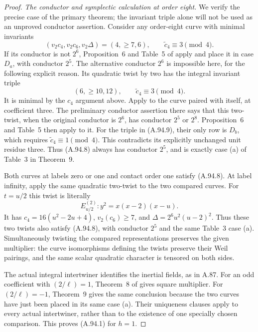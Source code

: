 \begin{proof}
\emph{The conductor and symplectic calculation at order eight.}
We verify the precise case of the primary theorem;
the invariant triple alone will not be used as an
unproved conductor assertion.
Consider any order-eight curve with minimal
invariants
\[
       (v_2c_4,v_2c_6,v_2\Delta)=(4,\ge7,6),
                   \qquad\widetilde c_4\equiv3\pmod4.
\tag{A.94.8}
\]
If its conductor is not $2^6$, Proposition~6 and
Table~5 of \cite{LegFreitasKraus2022} apply and
place it in case $D_a$, with conductor $2^5$.
The alternative conductor $2^6$ is impossible
here, for the following explicit reason.
Its quadratic twist by two has the integral
invariant triple
\[
                   (6,\ge10,12),
                 \qquad\widetilde c_4\equiv3\pmod4.
\tag{A.94.9}
\]
It is minimal by the $c_4$ argument above.
Apply \cite[Theorem~9]{LegFreitasKraus2022} to the
curve paired with itself, at coefficient three.
The preliminary conductor assertion there says
that this two-twist, when the original conductor
is $2^6$, has conductor $2^5$ or $2^8$.
Proposition~6 and Table~5 then apply to it.
For the triple in (A.94.9), their only row is
$D_b$, which requires
$\widetilde c_4\equiv1\pmod4$.
This contradicts its explicitly unchanged unit
residue three.  Thus (A.94.8) always has conductor
$2^5$, and is exactly case (a) of Table~3 in
Theorem~9.

Both curves at labels zero or one and contact
order one satisfy (A.94.8).
At label infinity, apply the same quadratic
two-twist to the two compared curves.
For $t=u/2$ this twist is literally
\[
                     E_{u/2}^{(2)}:
                        y^2=x(x-2)(x-u).
\tag{A.94.10}
\]
It has $c_4=16(u^2-2u+4)$, $v_2(c_6)\ge7$,
and $\Delta=2^6u^2(u-2)^2$.
Thus these two twists also satisfy (A.94.8),
with conductor $2^5$ and the same Table~3 case (a).
Simultaneously twisting the compared representations
preserves the given multiplier: the curve
isomorphisms defining the twists preserve their
Weil pairings, and the same scalar quadratic
character is tensored on both sides.

The actual integral intertwiner identifies the
inertial fields, as in A.87.
For an odd coefficient with $(2/\ell)=1$,
Theorem~8 of \cite{LegFreitasKraus2022}
gives square multiplier.
For $(2/\ell)=-1$, Theorem~9 gives the same
conclusion because the two curves have just
been placed in its same case (a).
Their uniqueness clauses apply to every actual
intertwiner, rather than to the existence of
one specially chosen comparison.
This proves (A.94.1) for $h=1$.


\end{proof}
